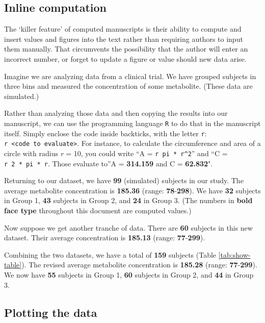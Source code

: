 \documentclass[smallextended]{svjour3}       %
\begin{document}
\hypertarget{sec:1}{%
\subsection{Inline computation}\label{sec:1}}

The `killer feature' of computed manuscripts is their ability to compute and insert values and figures into the text rather than requiring authors to input them manually. That circumvents the possibility that the author will enter an incorrect number, or forget to update a figure or value should new data arise.

Imagine we are analyzing data from a clinical trial. We have grouped subjects in three bins and measured the concentration of some metabolite. (These data are simulated.)

Rather than analyzing those data and then copying the results into our manuscript, we can use the programming language \texttt{R} to do that in the manuscript itself. Simply enclose the code inside backticks, with the letter \texttt{r}: \texttt{\textasciigrave{}r\ \textless{}code\ to\ evaluate\textgreater{}\textasciigrave{}}. For instance, to calculate the circumference and area of a circle with radius \emph{r} = 10, you could write ``A = \texttt{\textasciigrave{}r\ pi\ *\ r\^{}2\textasciigrave{}}'' and ``C = \texttt{\textasciigrave{}r\ 2\ *\ pi\ *\ r\textasciigrave{}}. Those evaluate to''A = \textbf{314.159} and C = \textbf{62.832}".

Returning to our dataset, we have \textbf{99} (simulated) subjects in our study. The average metabolite concentration is \textbf{185.36} (range: \textbf{78}-\textbf{298}). We have \textbf{32} subjects in Group 1, \textbf{43} subjects in Group 2, and \textbf{24} in Group 3. (The numbers in \textbf{bold face type} throughout this document are computed values.)

Now suppose we get another tranche of data. There are \textbf{60} subjects in this new dataset. Their average concentration is \textbf{185.13} (range: \textbf{77}-\textbf{299}).

Combining the two datasets, we have a total of \textbf{159} subjects (Table \ref{tab:show-table}). The revised average metabolite concentration is \textbf{185.28} (range: \textbf{77}-\textbf{299}). We now have \textbf{55} subjects in Group 1, \textbf{60} subjects in Group 2, and \textbf{44} in Group 3.

\hypertarget{sec:2}{%
\subsection{Plotting the data}\label{sec:2}}
\end{document}
